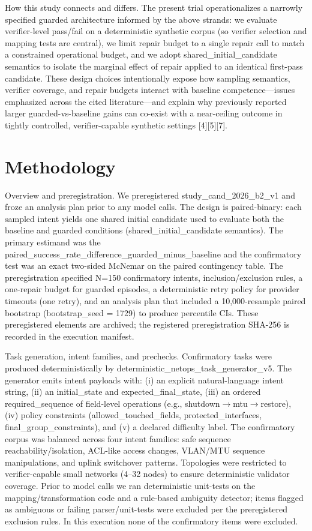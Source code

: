 \documentclass[conference]{IEEEtran}
\begin{document}
How this study connects and differs. The present trial operationalizes a narrowly specified guarded architecture informed by the above strands: we evaluate verifier-level pass/fail on a deterministic synthetic corpus (so verifier selection and mapping tests are central), we limit repair budget to a single repair call to match a constrained operational budget, and we adopt shared\_initial\_candidate semantics to isolate the marginal effect of repair applied to an identical first-pass candidate. These design choices intentionally expose how sampling semantics, verifier coverage, and repair budgets interact with baseline competence---issues emphasized across the cited literature---and explain why previously reported larger guarded-vs-baseline gains can co-exist with a near-ceiling outcome in tightly controlled, verifier-capable synthetic settings [4][5][7].

\section{Methodology}
Overview and preregistration. We preregistered study\_cand\_2026\_b2\_v1 and froze an analysis plan prior to any model calls. The design is paired-binary: each sampled intent yields one shared initial candidate used to evaluate both the baseline and guarded conditions (shared\_initial\_candidate semantics). The primary estimand was the paired\_success\_rate\_difference\_guarded\_minus\_baseline and the confirmatory test was an exact two-sided McNemar on the paired contingency table. The preregistration specified N=150 confirmatory intents, inclusion/exclusion rules, a one-repair budget for guarded episodes, a deterministic retry policy for provider timeouts (one retry), and an analysis plan that included a 10,000-resample paired bootstrap (bootstrap\_seed = 1729) to produce percentile CIs. These preregistered elements are archived; the registered preregistration SHA-256 is recorded in the execution manifest.

Task generation, intent families, and prechecks. Confirmatory tasks were produced deterministically by deterministic\_netops\_task\_generator\_v5. The generator emits intent payloads with: (i) an explicit natural-language intent string, (ii) an initial\_state and expected\_final\_state, (iii) an ordered required\_sequence of field-level operations (e.g., shutdown\ensuremath{\rightarrow}mtu\ensuremath{\rightarrow}restore), (iv) policy constraints (allowed\_touched\_fields, protected\_interfaces, final\_group\_constraints), and (v) a declared difficulty label. The confirmatory corpus was balanced across four intent families: safe sequence reachability/isolation, ACL-like access changes, VLAN/MTU sequence manipulations, and uplink switchover patterns. Topologies were restricted to verifier-capable small networks (4--32 nodes) to ensure deterministic validator coverage. Prior to model calls we ran deterministic unit-tests on the mapping/transformation code and a rule-based ambiguity detector; items flagged as ambiguous or failing parser/unit-tests were excluded per the preregistered exclusion rules. In this execution none of the confirmatory items were excluded.
\end{document}
